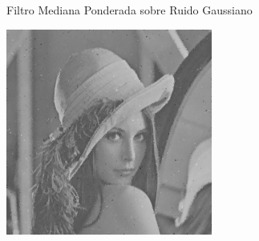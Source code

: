 \documentclass{beamer}
\begin{document}
\begin{frame}[fragile]{Filtro Mediana Ponderada sobre Ruido Gaussiano}
\begin{minipage}{0.25\linewidth}
	\end{minipage}\hfill
	\begin{minipage}{0.25\linewidth}
		\centering
		\includegraphics[width=\linewidth]{../results/lena_gauss_sigma50_mediana_ponderada}
	\end{minipage}
\end{frame}
\end{document}
